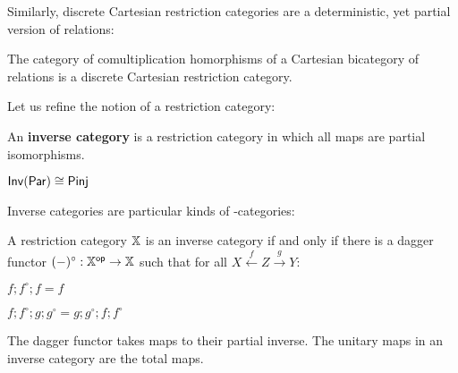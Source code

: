 %
%
Similarly, discrete Cartesian restriction categories are a deterministic, yet partial version of relations:
\begin{lemma}
The category of comultiplication homorphisms of a Cartesian bicategory of relations is a discrete Cartesian restriction category.
\end{lemma}
Let us refine the notion of a restriction category:
\begin{definition}
An {\bf inverse category} is a restriction category in which all maps are partial isomorphisms.
\end{definition}
\begin{example}
$\mathsf{Inv}(\mathsf{Par})\cong\mathsf{Pinj}$
\end{example}
Inverse categories are particular kinds of \dag-categories:
\begin{theorem}
A restriction category $\mathbb{X}$ is an inverse category if and only if there is a dagger functor $(-)^\circ:\mathbb{X}^{\mathsf{op}}\to\mathbb{X}$ such that for all $X\xleftarrow{f} Z \xrightarrow{g} Y$:
\begin{multicols}{2}
\begin{enumerate}[label={\bf [INV.\arabic*]}, ref={\bf [INV.\arabic*]}]
\item $f; f^\circ ; f = f$
\label{INV.1}
\item $f ; f ^\circ ;g; g^\circ = g;g^\circ ; f; f ^\circ $
\label{INV.2}
\end{enumerate}
\end{multicols}
\end{theorem}
The dagger functor takes maps to their partial inverse.
The unitary maps in an inverse category are the total maps.


